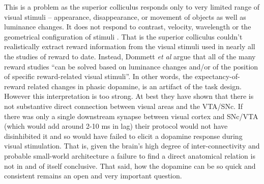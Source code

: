 \documentclass[doc,12pt]{apa}        %
\begin{document}
This is a problem as the superior colliculus responds only to very limited range of visual stimuli -- appearance, disappearance, or movement of objects as well as luminance changes.  It does not respond to contrast, velocity, wavelength or the geometrical configuration of stimuli \cite{Dommett:2005p7263}. That is the superior colliculus couldn't realistically extract reward information from the visual stimuli used in nearly all the studies of reward to date.  Instead, Dommett \emph{et al} argue that all of the many reward studies ``can be solved based on luminance changes and/or of the position of specific reward-related visual stimuli''.  In other words, the expectancy-of-reward related changes in phasic dopamine, is an artifact of the task design.  However this interpretation is too strong.  At best they have shown that there is not substantive direct connection between visual areas and the VTA/SNc.  If there was only a single downstream synapse between visual cortex and SNc/VTA (which would add around 2-10 ms in lag) their protocol would not have disinhibited it and so would have failed to elicit a dopamine response during visual stimulation.   That is, given the brain's high degree of inter-connectivity and probable small-world architecture \cite{bassett:2006aa} a failure to find a direct anatomical relation is not in and of itself conclusive.  That said, how the dopamine can be so quick and consistent remains an open and very important question.
\end{document}
